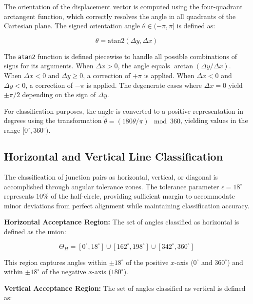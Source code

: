 The orientation of the displacement vector is computed using the four-quadrant arctangent function, which correctly resolves the angle in all quadrants of the Cartesian plane. The signed orientation angle $\theta \in (-\pi, \pi]$ is defined as:

\begin{equation}
\theta = \text{atan2}(\Delta y, \Delta x)
\label{eq:angular-orientation}
\end{equation}

The \texttt{atan2} function is defined piecewise to handle all possible combinations of signs for its arguments. When $\Delta x > 0$, the angle equals $\arctan(\Delta y / \Delta x)$. When $\Delta x < 0$ and $\Delta y \ge 0$, a correction of $+\pi$ is applied. When $\Delta x < 0$ and $\Delta y < 0$, a correction of $-\pi$ is applied. The degenerate cases where $\Delta x = 0$ yield $\pm\pi/2$ depending on the sign of $\Delta y$.

For classification purposes, the angle is converted to a positive representation in degrees using the transformation $\tilde{\theta} = (180\theta / \pi) \mod 360$, yielding values in the range $[0^\circ, 360^\circ)$.

\subsection{Horizontal and Vertical Line Classification}

The classification of junction pairs as horizontal, vertical, or diagonal is accomplished through angular tolerance zones. The tolerance parameter $\epsilon = 18^\circ$ represents 10\% of the half-circle, providing sufficient margin to accommodate minor deviations from perfect alignment while maintaining classification accuracy.

\textbf{Horizontal Acceptance Region:} The set of angles classified as horizontal is defined as the union:

\begin{equation}
\Theta_H = [0^\circ, 18^\circ] \cup [162^\circ, 198^\circ] \cup [342^\circ, 360^\circ]
\label{eq:horizontal-region}
\end{equation}

This region captures angles within $\pm 18^\circ$ of the positive $x$-axis ($0^\circ$ and $360^\circ$) and within $\pm 18^\circ$ of the negative $x$-axis ($180^\circ$).

\textbf{Vertical Acceptance Region:} The set of angles classified as vertical is defined as:

